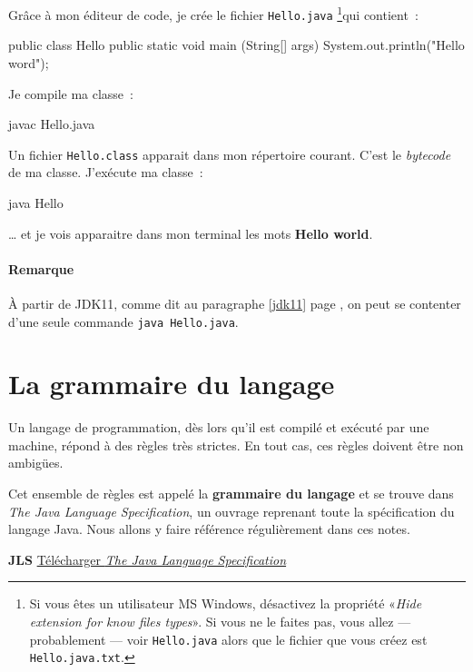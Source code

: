 Grâce à mon éditeur de code, je crée le fichier \texttt{Hello.java}
\footnote{%
	Si vous êtes un utilisateur MS Windows, désactivez la propriété
	«\textit{Hide extension for know files types}». Si vous ne le faites pas,
	vous allez — probablement — voir \texttt{Hello.java} alors que le fichier
	que vous créez est \texttt{Hello.java.txt}.
}qui contient~:

\begin{java}
public class Hello{
	public static void main (String[] args) { 
		System.out.println("Hello word");
	}
}
\end{java}

Je compile ma classe~:

\begin{term}
	javac Hello.java
\end{term}

Un fichier \texttt{Hello.class} apparait dans mon répertoire courant. C'est le 
\textit{bytecode} de ma classe. J'exécute ma classe~:

\begin{term}
	java Hello
\end{term}

… et je vois apparaitre dans mon terminal les mots \textbf{Hello world}. 

\paragraph{Remarque}

À partir de JDK11, comme dit au paragraphe \ref{jdk11} page \pageref{jdk11}, on 
peut se contenter d'une seule commande \verb_java Hello.java_. 



\section{La grammaire du langage}

Un langage de programmation, dès lors qu'il est compilé et exécuté par une
machine, répond à des règles très strictes. En tout cas, ces règles doivent être
non ambigües. 

Cet ensemble de règles est appelé la \textbf{grammaire du
langage} et se trouve dans \textit{The Java Language
Specification}, un ouvrage reprenant toute la spécification du langage Java.
Nous allons y faire référence régulièrement dans ces notes. 

\textbf{JLS} 
\href{https://docs.oracle.com/javase/specs/}
{Télécharger \textit{The Java Language Specification}}

